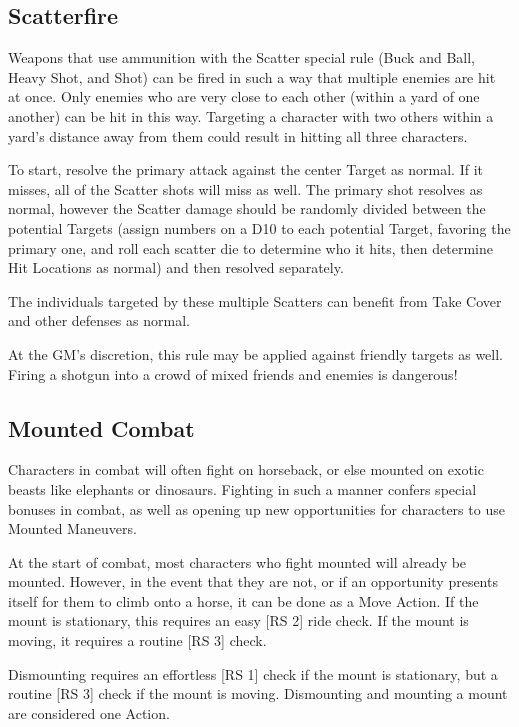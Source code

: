 \documentclass[oneside,11pt,english]{book}
\begin{document}
\subsection{Scatterfire}\label{sec:scatterfire} %
Weapons that use ammunition with the Scatter special rule (Buck and Ball, Heavy Shot, and Shot) can be fired in such a way that multiple enemies are hit at once. Only enemies who are very close to each other (within a yard of one another) can be hit in this way. Targeting a character with two others within a yard’s distance away from them could result in hitting all three characters.

To start, resolve the primary attack against the center Target as normal. If it misses, all of the Scatter shots will miss as well. The primary shot resolves as normal, however the Scatter damage should be randomly divided between the potential Targets (assign numbers on a D10 to each potential Target, favoring the primary one, and roll each scatter die to determine who it hits, then determine Hit Locations as normal) and then resolved separately.

The individuals targeted by these multiple Scatters can benefit from Take Cover and other defenses as normal.

At the GM’s discretion, this rule may be applied against friendly targets as well. Firing a shotgun into a crowd of mixed friends and enemies is dangerous!

\subsection{Mounted Combat}\label{sec:mounted-combat}
Characters in combat will often fight on horseback, or else mounted on exotic beasts like elephants or dinosaurs. Fighting in such a manner confers special bonuses in combat, as well as opening up new opportunities for characters to use Mounted Maneuvers.

At the start of combat, most characters who fight mounted will already be mounted. However, in the event that they are not, or if an opportunity presents itself for them to climb onto a horse, it can be done as a Move Action. If the mount is stationary, this requires an easy [RS 2] ride check. If the mount is moving, it requires a routine [RS 3] check.

Dismounting requires an effortless [RS 1] check if the mount is stationary, but a routine [RS 3] check if the mount is moving. Dismounting and mounting a mount are considered one Action.
\end{document}
